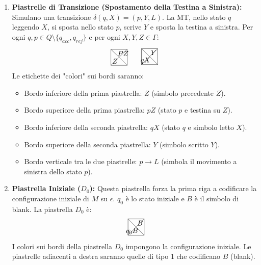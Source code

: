 \documentclass[a4paper]{article}
\begin{document}
\begin{enumerate}
    \item \textbf{Piastrelle di Transizione (Spostamento della Testina a Sinistra):}
    Simulano una transizione $\delta(q, X) = (p, Y, L)$. La MT, nello stato $q$ leggendo $X$, si sposta nello stato $p$, scrive $Y$ e sposta la testina a sinistra.
    Per ogni $q, p \in Q \setminus \{q_{acc}, q_{rej}\}$ e per ogni $X, Y, Z \in \Gamma$:
    \[
    \begin{tikzpicture}[scale=0.8]
    \draw (0,0) -- (1,0) -- (1,1) -- (0,1) -- cycle;
    \draw (0,0) -- (1,1);
    \draw (1,0) -- (0,1);
    \node at (0.25, 0.75) {}; %
    \node at (0.75, 0.75) {$PZ$}; %
    \node at (0.25, 0.25) {$Z$}; %
    \node at (0.75, 0.25) {}; %
    \end{tikzpicture}
    \quad
    \begin{tikzpicture}[scale=0.8]
    \draw (0,0) -- (1,0) -- (1,1) -- (0,1) -- cycle;
    \draw (0,0) -- (1,1);
    \draw (1,0) -- (0,1);
    \node at (0.25, 0.75) {}; %
    \node at (0.75, 0.75) {$Y$}; %
    \node at (0.25, 0.25) {$qX$}; %
    \node at (0.75, 0.25) {}; %
    \end{tikzpicture}
    \]
    Le etichette dei "colori" sui bordi saranno:
    \begin{itemize}
        \item Bordo inferiore della prima piastrella: $Z$ (simbolo precedente $Z$).
        \item Bordo superiore della prima piastrella: $pZ$ (stato $p$ e testina su $Z$).
        \item Bordo inferiore della seconda piastrella: $qX$ (stato $q$ e simbolo letto $X$).
        \item Bordo superiore della seconda piastrella: $Y$ (simbolo scritto $Y$).
        \item Bordo verticale tra le due piastrelle: $p \to L$ (simbola il movimento a sinistra dello stato $p$).
    \end{itemize}

    \item \textbf{Piastrella Iniziale ($D_0$):}
    Questa piastrella forza la prima riga a codificare la configurazione iniziale di $M$ su $\epsilon$. $q_0$ è lo stato iniziale e $B$ è il simbolo di blank.
    La piastrella $D_0$ è:
    \[
    \begin{tikzpicture}[scale=0.8]
    \draw (0,0) -- (1,0) -- (1,1) -- (0,1) -- cycle;
    \draw (0,0) -- (1,1);
    \draw (1,0) -- (0,1);
    \node at (0.25, 0.75) {}; %
    \node at (0.75, 0.75) {$B$}; %
    \node at (0.25, 0.25) {$q_0B$}; %
    \node at (0.75, 0.25) {}; %
    \end{tikzpicture}
    \]
    I colori sui bordi della piastrella $D_0$ impongono la configurazione iniziale. Le piastrelle adiacenti a destra saranno quelle di tipo 1 che codificano $B$ (blank).
\end{enumerate}
\end{document}

